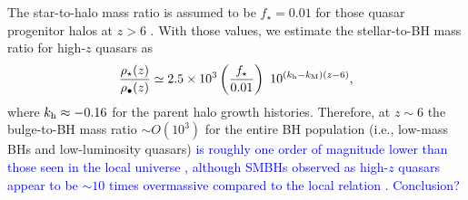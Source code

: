 \documentclass[twocolumn, twocolappendix]{aastex63}
\newcommand{\Msunyr}{M_\odot~{\rm yr}^{-1}}
\newcommand{\Mh}{M_\mathrm{h}}
\newcommand{\D}{\mathrm{d}}
\newcommand{\red}[1]{\textcolor{red}{ #1}}
\newcommand{\blue}[1]{\textcolor{blue}{ #1}}
\begin{document}
\begin{CJK*}{UTF8}{gbsn}

The star-to-halo mass ratio is assumed to be $f_\star =0.01$ for those quasar progenitor halos at $z>6$
\citep[fits by code {\tt UNIVERSEMACHINE} in][]{2019MNRAS.488.3143B}.
With those values, we estimate the stellar-to-BH mass ratio for high-$z$ quasars as
%
\begin{equation}
\frac{\rho_{\star}(z)}{\rho_{\bullet}(z)}
\simeq 2.5\times 10^{3} \left(\frac{f_\star}{0.01}\right)
~ 10^{(k_{\rm h}-k_{\rm M})(z-6)},
\end{equation}
% 
where $k_{\rm h} \approx -0.16 $ for the parent halo growth histories.
Therefore, at $z\sim 6$ the bulge-to-BH mass ratio $\sim O(10^3)$ for the entire BH population (i.e., low-mass BHs and low-luminosity quasars) 
\blue{
is roughly one order of magnitude lower than those seen in the local universe \citep[$\simeq$ 200 from][]{2013ARA&A..51..511K},
although SMBHs observed as high-$z$ quasars appear to be $\sim 10$ times overmassive compared to the local relation 
\citep[e.g.,][]{2013ApJ...773...44W,2020A&A...637A..84P,2021ApJ...911..141N}.
Conclusion?
}


\end{CJK*}
\end{document}
